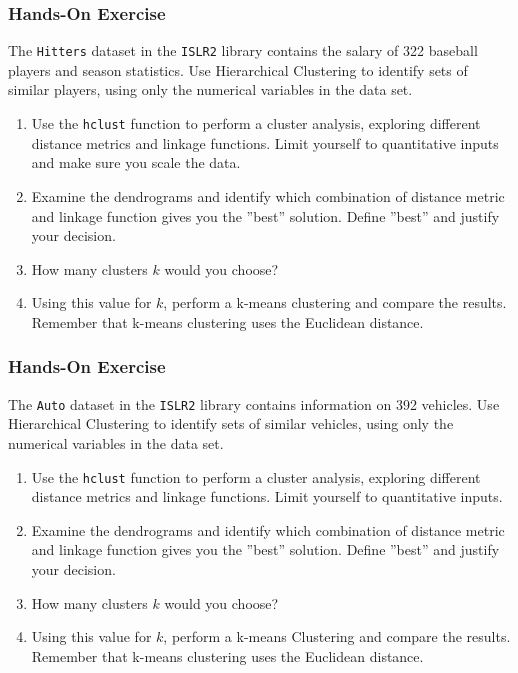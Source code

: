 \begin{tcolorbox}[colback=code]
\subsubsection*{Hands-On Exercise} 
The \texttt{Hitters} dataset in the \texttt{ISLR2} library contains the salary of 322 baseball players and season statistics. Use Hierarchical Clustering to identify sets of similar players, using only the numerical variables in the data set.

\begin{enumerate}
   \item Use the \texttt{hclust} function to perform a cluster analysis, exploring different distance metrics and linkage functions. Limit yourself to quantitative inputs and make sure you scale the data.
   \item Examine the dendrograms and identify which combination of distance metric and linkage function gives you the ''best'' solution. Define ''best'' and justify your decision.
   \item How many clusters $k$ would you choose?
   \item Using this value for $k$, perform a k-means clustering and compare the results. Remember that k-means clustering uses the Euclidean distance.
\end{enumerate}
\end{tcolorbox}

\begin{tcolorbox}[colback=code]
\subsubsection*{Hands-On Exercise} 
The \texttt{Auto} dataset in the \texttt{ISLR2} library contains information on 392 vehicles. Use Hierarchical Clustering to identify sets of similar vehicles, using only the numerical variables in the data set.

\begin{enumerate}
   \item Use the \texttt{hclust} function to perform a cluster analysis, exploring different distance metrics and linkage functions. Limit yourself to quantitative inputs.
   \item Examine the dendrograms and identify which combination of distance metric and linkage function gives you the ''best'' solution. Define ''best'' and justify your decision.
   \item How many clusters $k$ would you choose?
   \item Using this value for $k$, perform a k-means Clustering and compare the results. Remember that k-means clustering uses the Euclidean distance.
\end{enumerate}
\end{tcolorbox}

